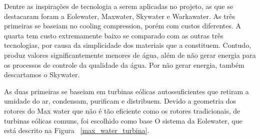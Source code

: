% 
% 
% 
% 
% 
 
Dentre as inspirações de tecnologia a serem aplicadas no projeto, as que se destacaram foram a Eolewater, Maxwater, Skywater
e Warkawater. As três primeiras se baseiam no cooling compression, porém com custos diferentes. A quarta tem custo  
extremamente baixo se comparado com as outras três tecnologias, por causa da simplicidade dos materiais que a constituem.
Contudo, produz valores significantemente menores de água, além de não gerar energia para os processos de controle da qualidade
da água. Por não gerar energia, também descartamos o Skywater.

As duas primeiras se baseiam em turbinas eólicas autossuficientes que retiram a umidade do ar, condensam,
purificam e distribuem. Devido a geometria dos rotores do Max water que não é tão eficiente como os rotores tradicionais,
de turbinas eólicas comuns, foi escolhido como base O sistema da Eolewater, que está descrito na Figura ~\ref{max_water_turbina}.

